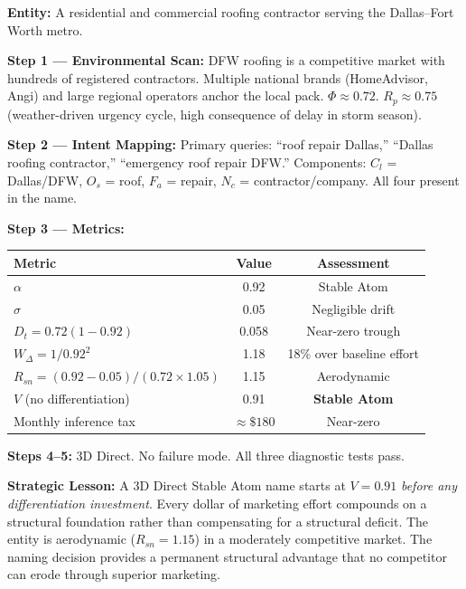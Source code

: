 \documentclass[12pt, openany]{book}
\theoremstyle{thmstyle}
\theoremstyle{defstyle}
\begin{document}
\begin{casebox}
\textbf{Entity:} A residential and commercial roofing contractor serving the Dallas--Fort Worth metro.

\textbf{Step 1 --- Environmental Scan:}
DFW roofing is a competitive market with hundreds of registered contractors. Multiple national brands (HomeAdvisor, Angi) and large regional operators anchor the local pack. $\Phi \approx 0.72$. $R_p \approx 0.75$ (weather-driven urgency cycle, high consequence of delay in storm season).

\textbf{Step 2 --- Intent Mapping:}
Primary queries: ``roof repair Dallas,'' ``Dallas roofing contractor,'' ``emergency roof repair DFW.'' Components: $C_l$ = Dallas/DFW, $O_s$ = roof, $F_a$ = repair, $N_c$ = contractor/company. All four present in the name.

\textbf{Step 3 --- Metrics:}
\begin{center}
\begin{tabular}{lcc}
\toprule
Metric & Value & Assessment \\
\midrule
$\alpha$ & 0.92 & Stable Atom \\
$\sigma$ & 0.05 & Negligible drift \\
$D_t = 0.72(1-0.92)$ & 0.058 & Near-zero trough \\
$W_\Delta = 1/0.92^2$ & 1.18 & 18\% over baseline effort \\
$R_{sn} = (0.92-0.05)/(0.72 \times 1.05)$ & 1.15 & Aerodynamic \\
$V$ (no differentiation) & 0.91 & \textbf{Stable Atom} \\
Monthly inference tax & $\approx \$180$ & Near-zero \\
\bottomrule
\end{tabular}
\end{center}

\textbf{Steps 4--5:} 3D Direct. No failure mode. All three diagnostic tests pass.

\textbf{Strategic Lesson:} A 3D Direct Stable Atom name starts at $V = 0.91$ \textit{before any differentiation investment}. Every dollar of marketing effort compounds on a structural foundation rather than compensating for a structural deficit. The entity is aerodynamic ($R_{sn} = 1.15$) in a moderately competitive market. The naming decision provides a permanent structural advantage that no competitor can erode through superior marketing.
\end{casebox}
\end{document}
